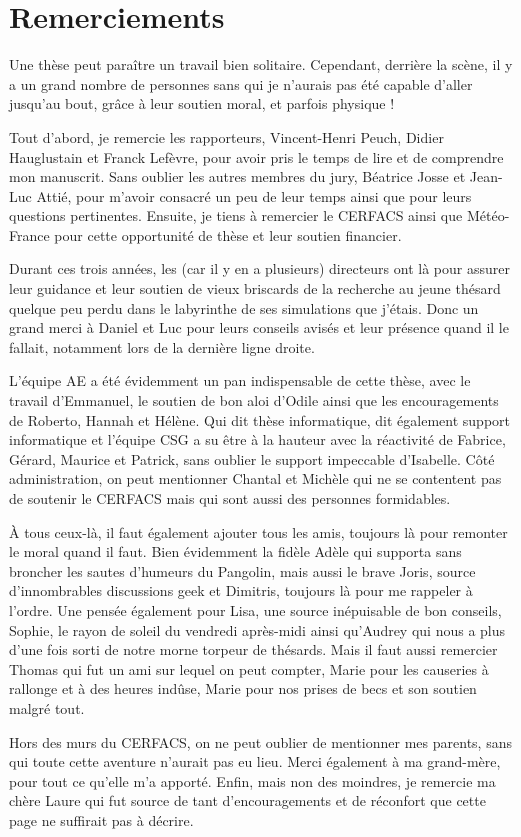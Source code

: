 \newpage
\thispagestyle{empty} 

\section*{Remerciements}

Une thèse peut paraître un travail bien solitaire. Cependant, derrière la scène,
il y a un grand nombre de personnes sans qui je n'aurais pas été capable d'aller
jusqu'au bout, grâce à leur soutien moral, et parfois physique !

Tout d'abord, je remercie les rapporteurs, Vincent-Henri Peuch, Didier
Hauglustain et Franck Lefèvre, pour avoir pris le temps de lire et de comprendre
mon manuscrit. Sans oublier les autres membres du jury, Béatrice Josse et
Jean-Luc Attié, pour m'avoir consacré un peu de leur temps ainsi que pour leurs
questions pertinentes. Ensuite, je tiens à remercier le CERFACS ainsi que
Météo-France pour cette opportunité de thèse et leur soutien financier.

Durant ces trois années, les (car il y en a plusieurs) directeurs ont là pour assurer
leur guidance et leur soutien de vieux briscards de la recherche au jeune
thésard quelque peu perdu dans le labyrinthe de ses simulations que j'étais.
Donc un grand merci à Daniel et Luc pour leurs conseils avisés et leur
présence quand il le fallait, notamment lors de la dernière ligne droite. 

L'équipe AE a été évidemment un pan indispensable de cette thèse, avec le
travail d'Emmanuel, le soutien de bon aloi d'Odile ainsi que les encouragements
de Roberto, Hannah et Hélène. Qui dit thèse informatique, dit également support
informatique et l'équipe CSG a su être à la hauteur avec la réactivité de
Fabrice, Gérard, Maurice et Patrick, sans oublier le support impeccable
d'Isabelle. Côté administration, on peut mentionner Chantal et
Michèle qui ne se contentent pas de soutenir le CERFACS mais qui sont aussi des
personnes formidables.

À tous ceux-là, il faut également ajouter tous les amis, toujours là pour
remonter le moral quand il faut. Bien évidemment la fidèle Adèle qui supporta
sans broncher les sautes d'humeurs du Pangolin, mais aussi le brave Joris,
source d'innombrables discussions geek et Dimitris, toujours là pour me rappeler
à l'ordre. Une pensée également pour Lisa, une source inépuisable de bon
conseils, Sophie, le rayon de soleil du vendredi après-midi ainsi qu'Audrey qui
nous a plus d'une fois sorti de notre morne torpeur de thésards.  Mais il faut
aussi remercier Thomas qui fut un ami sur lequel on peut compter, Marie  pour
les causeries à rallonge et à des heures indûse, Marie  pour nos prises de
becs et son soutien malgré tout.

Hors des murs du CERFACS, on ne peut oublier de mentionner mes parents, sans qui
toute cette aventure n'aurait pas eu lieu. Merci également à ma grand-mère, pour
tout ce qu'elle m'a apporté. Enfin, mais non des moindres, je remercie ma chère
Laure qui fut source de tant d'encouragements et de réconfort que cette page ne
suffirait pas à décrire.



